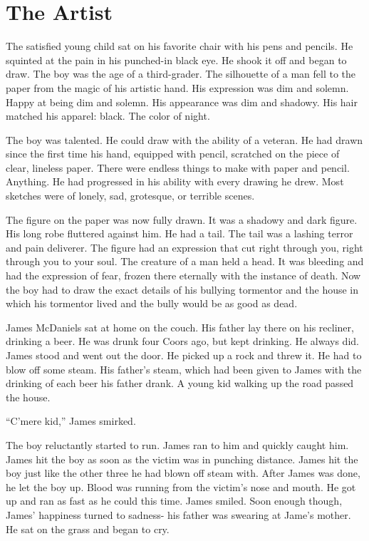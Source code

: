 \chapter{The Artist}


The satisfied young child sat on his favorite chair with his pens and
pencils. He squinted at the pain in his punched-in black eye. He shook
it off and began to draw. The boy was the age of a third-grader. The
silhouette of a man fell to the paper from the magic of his artistic
hand. His expression was dim and solemn. Happy at being dim and
solemn. His appearance was dim and shadowy. His hair matched his
apparel: black. The color of night.

The boy was talented. He could draw with the ability of a veteran. He
had drawn since the first time his hand, equipped with pencil, scratched
on the piece of clear, lineless paper. There were endless things to make
with paper and pencil. Anything. He had progressed in his ability with
every drawing he drew. Most sketches were of lonely, sad, grotesque, or
terrible scenes.

The figure on the paper was now fully drawn. It was a shadowy and dark
figure. His long robe fluttered against him. He had a tail. The tail was
a lashing terror and pain deliverer. The figure had an expression that
cut right through you, right through you to your soul. The creature of a
man held a head. It was bleeding and had the expression of fear, frozen
there eternally with the instance of death. Now the boy had to draw the
exact details of his bullying tormentor and the house in which his
tormentor lived and the bully would be as good as dead.

James McDaniels sat at home on the couch. His father lay there on his
recliner, drinking a beer. He was drunk four Coors ago, but kept
drinking. He always did. James stood and went out the door. He picked up
a rock and threw it. He had to blow off some steam. His father's steam,
which had been given to James with the drinking of each beer his father
drank. A young kid walking up the road passed the house.

``C'mere kid,'' James smirked.

The boy reluctantly started to run. James ran to him and quickly caught
him. James hit the boy as soon as the victim was in punching
distance. James hit the boy just like the other three he had blown off
steam with. After James was done, he let the boy up. Blood was running
from the victim's nose and mouth. He got up and ran as fast as he could
this time. James smiled. Soon enough though, James' happiness turned to
sadness- his father was swearing at Jame's mother. He sat on the grass
and began to cry.

